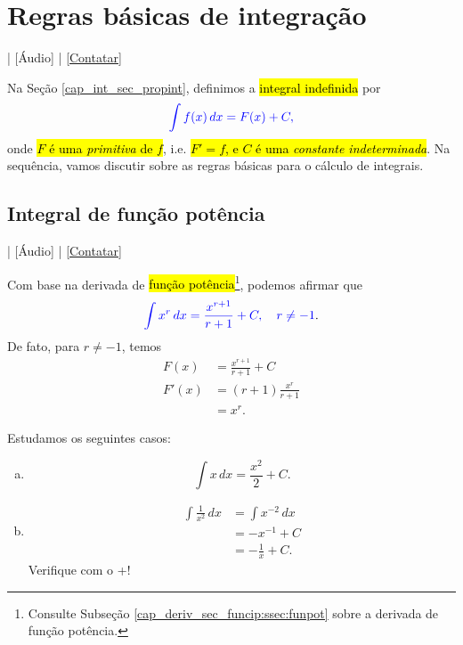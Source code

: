 \section{Regras básicas de integração}\label{cap_int_sec_regrasbasic}

\begin{flushright}
  [Vídeo] | [Áudio] | \href{https://phkonzen.github.io/notas/contato.html}{[Contatar]}
\end{flushright}

Na Seção \ref{cap_int_sec_propint}, definimos a \hl{integral indefinida} por
\begin{equation}\color{blue}\int f(x)\,dx = F(x) + C,
\end{equation}
onde \hl{$F$ é uma \emph{primitiva} de $f$}, i.e. \hl{$F' = f$, e $C$ é uma \emph{constante indeterminada}}. Na sequência, vamos discutir sobre as regras básicas para o cálculo de integrais.

\subsection{Integral de função potência}

\begin{flushright}
  [Vídeo] | [Áudio] | \href{https://phkonzen.github.io/notas/contato.html}{[Contatar]}
\end{flushright}

Com base na derivada de \hl{função potência}\footnote{Consulte Subseção \ref{cap_deriv_sec_funcip:ssec:funpot} sobre a derivada de função potência.}, podemos afirmar que
\begin{equation}\label{eq:int_fpot}
  {\color{blue}\int x^r\,dx = \frac{x^{r+1}}{r+1} + C,\quad r\neq -1}.
\end{equation}
De fato, para $r\neq -1$, temos
\begin{align}
  F(x) &= \frac{x^{r+1}}{r+1} + C \\
  F'(x) &= (r+1) \frac{x^r}{r+1} \\
  &= x^r.
\end{align}

\begin{ex}
  Estudamos os seguintes casos:
  \begin{enumerate}[a)]
  \item
    \begin{equation}
      \int x\,dx = \frac{x^2}{2} + C.
    \end{equation}
  \item
    \begin{align}
      \int \frac{1}{x^2}\,dx &= \int x^{-2}\,dx \\
                             &= -x^{-1} + C \\
                             &= -\frac{1}{x}+C.
    \end{align}
    \ifispython
    Verifique com o {\python}+{\sympy}!
    \fi
  \end{enumerate}
\end{ex}

